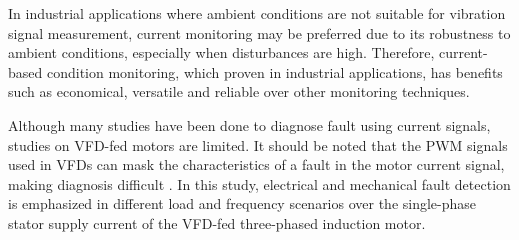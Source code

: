 In industrial applications where ambient conditions are not suitable for vibration signal measurement, current monitoring may be preferred due to its robustness to ambient conditions, especially when disturbances are high.
Therefore, current-based condition monitoring, which proven in industrial applications, has benefits such as economical, versatile and reliable over other monitoring techniques.

Although many studies have been done to diagnose fault using current signals, studies on VFD-fed motors are limited. It should be noted that the PWM signals used in VFDs can mask the characteristics of a fault in the motor current signal, making diagnosis difficult \cite{shaeboub2018monitoring}. In this study, electrical and mechanical fault detection is emphasized in different load and frequency scenarios over the single-phase stator supply current of the VFD-fed three-phased induction motor.



